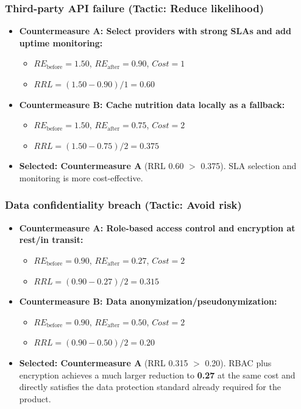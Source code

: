\documentclass[11pt]{article}
\begin{document}
\subsubsection*{Third-party API failure (Tactic: Reduce likelihood)}
\begin{itemize}[leftmargin=1.5em]
  \item \textbf{Countermeasure A: Select providers with strong SLAs and add uptime monitoring:}
  \begin{itemize}[leftmargin=1.5em]
    \item $RE_{\text{before}} = 1.50$, $RE_{\text{after}} = 0.90$, $Cost = 1$
    \item $RRL = (1.50 - 0.90) / 1 = 0.60$
  \end{itemize}
  \item \textbf{Countermeasure B: Cache nutrition data locally as a fallback:}
  \begin{itemize}[leftmargin=1.5em]
    \item $RE_{\text{before}} = 1.50$, $RE_{\text{after}} = 0.75$, $Cost = 2$
    \item $RRL = (1.50 - 0.75) / 2 = 0.375$
  \end{itemize}
  \item \textbf{Selected: Countermeasure A} (RRL 0.60 $>$ 0.375). SLA selection and monitoring is more cost-effective.
\end{itemize}

\subsubsection*{Data confidentiality breach (Tactic: Avoid risk)}
\begin{itemize}[leftmargin=1.5em]
  \item \textbf{Countermeasure A: Role-based access control and encryption at rest/in transit:}
  \begin{itemize}[leftmargin=1.5em]
    \item $RE_{\text{before}} = 0.90$, $RE_{\text{after}} = 0.27$, $Cost = 2$
    \item $RRL = (0.90 - 0.27) / 2 = 0.315$
  \end{itemize}
  \item \textbf{Countermeasure B: Data anonymization/pseudonymization:}
  \begin{itemize}[leftmargin=1.5em]
    \item $RE_{\text{before}} = 0.90$, $RE_{\text{after}} = 0.50$, $Cost = 2$
    \item $RRL = (0.90 - 0.50) / 2 = 0.20$
  \end{itemize}
  \item \textbf{Selected: Countermeasure A} (RRL 0.315 $>$ 0.20). RBAC plus encryption achieves a much larger reduction to \textbf{0.27} at the same cost and directly satisfies the data protection standard already required for the product.
\end{itemize}
\end{document}

